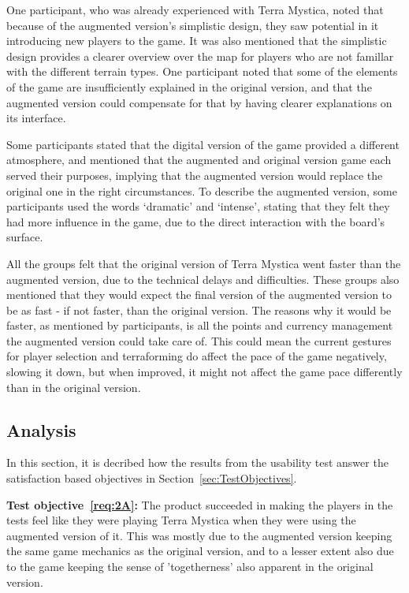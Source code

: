 One participant, who was already experienced with Terra Mystica, noted that because of the augmented version’s simplistic design, they saw potential in it introducing new players to the game. It was also mentioned that the simplistic design provides a clearer overview over the map for players who are not famillar with the different terrain types. One participant noted that some of the elements of the game are insufficiently explained in the original version, and that the augmented version could compensate for that by having clearer explanations on its interface.

Some participants stated that the digital version of the game provided a different atmosphere, and mentioned that the augmented and original version game each served their purposes, implying that the augmented version would replace the original one in the right circumstances. To describe the augmented version, some participants used the words ‘dramatic’ and ‘intense’, stating that they felt they had more influence in the game, due to the direct interaction with the board’s surface.

All the groups felt that the original version of Terra Mystica went faster than the augmented version, due to the technical delays and difficulties. These groups also mentioned that they would expect the final version of the augmented version to be as fast - if not faster, than the original version. The reasons why it would be faster, as mentioned by participants, is all the points and currency management the augmented version could take care of. This could mean the current gestures for player selection and terraforming do affect the pace of the game negatively, slowing it down, but when improved, it might not affect the game pace differently than in the original version.

\subsection{Analysis}
In this section, it is decribed how the results from the usability test answer the satisfaction based objectives in Section~\ref{sec:TestObjectives}.

\textbf{Test objective~\ref{req:2A}:} The product succeeded in making the players in the tests feel like they were playing Terra Mystica when they were using the augmented version of it. This was mostly due to the augmented version keeping the same game mechanics as the original version, and to a lesser extent also due to the game keeping the sense of 'togetherness' also apparent in the original version.

